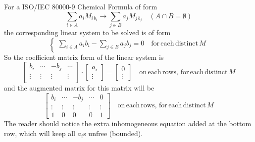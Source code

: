 \documentclass[12pt,a4paper]{article}
\begin{document}
For a ISO/IEC 80000-9 Chemical Formula of form
$$
\sum_{i\in A} a_iM_{i\,b_i} \rightarrow \sum_{j\in B} a_jM_{j\,b_j} \quad (A \cap B = \emptyset)
$$
the corresponding linear system to be solved is of form
$$
\begin{cases}
\displaystyle{\sum_{i\in A}}a_ib_i - \displaystyle{\sum_{j\in B}}a_jb_j = 0\quad \mathrm{for\,each\,distinct\,}M
\end{cases}
$$
So the coefficient matrix form of the linear system is
$$
\left[
\begin{array}{cccc}
b_i & \cdots & -b_j & \cdots \\
\vdots & \vdots & \vdots & \vdots \\
\end{array}
\right]
\cdot
\left[
\begin{array}{c}
a_i \\ \vdots
\end{array}
\right]
=
\left[
\begin{array}{c}
0 \\ \vdots
\end{array}
\right]
\quad \mathrm{on\,each\,rows,\,for\,each\,distinct\,}M
$$
and the augmented matrix for this matrix will be
$$
\left[
\begin{array}{cccc|c}
b_i & \cdots & -b_j & \cdots & 0 \\
\vdots & \vdots & \vdots & \vdots & \vdots \\
1 & 0 & 0 & 0 & 1
\end{array}
\right]
\quad \mathrm{on\,each\,rows,\,for\,each\,distinct\,}M
$$
The reader should notice the extra inhomogeneous equation added at the bottom row, which will keep all $a_i$s unfree (bounded).
\end{document}
